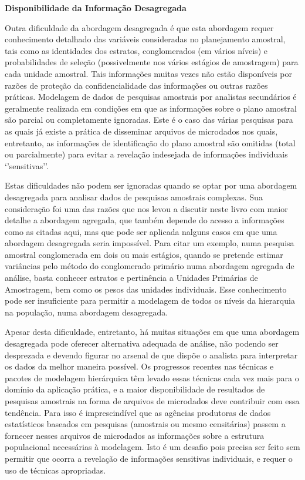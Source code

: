 \documentclass[]{book}
\theoremstyle{definition}
\theoremstyle{definition}
\theoremstyle{definition}
\theoremstyle{remark}
\begin{document}
\textbf{Disponibilidade da Informação Desagregada}

Outra dificuldade da abordagem desagregada é que esta abordagem requer
conhecimento detalhado das variáveis consideradas no planejamento
amostral, tais como as identidades dos estratos, conglomerados (em
vários níveis) e probabilidades de seleção (possivelmente nos vários
estágios de amostragem) para cada unidade amostral. Tais informações
muitas vezes não estão disponíveis por razões de proteção da
confidencialidade das informações ou outras razões práticas. Modelagem
de dados de pesquisas amostrais por analistas secundários é geralmente
realizada em condições em que as informações sobre o plano amostral são
parcial ou completamente ignoradas. Este é o caso das várias pesquisas
para as quais já existe a prática de disseminar arquivos de microdados
nos quais, entretanto, as informações de identificação do plano amostral
são omitidas (total ou parcialmente) para evitar a revelação indesejada
de informações individuais `'sensitivas''.

Estas dificuldades não podem ser ignoradas quando se optar por uma
abordagem desagregada para analisar dados de pesquisas amostrais
complexas. Sua consideração foi uma das razões que nos levou a discutir
neste livro com maior detalhe a abordagem agregada, que também depende
do acesso a informações como as citadas aqui, mas que pode ser aplicada
nalguns casos em que uma abordagem desagregada seria impossível. Para
citar um exemplo, numa pesquisa amostral conglomerada em dois ou mais
estágios, quando se pretende estimar variâncias pelo método do
conglomerado primário numa abordagem agregada de análise, basta conhecer
estratos e pertinência a Unidades Primárias de Amostragem, bem como os
pesos das unidades individuais. Esse conhecimento pode ser insuficiente
para permitir a modelagem de todos os níveis da hierarquia na população,
numa abordagem desagregada.

Apesar desta dificuldade, entretanto, há muitas situações em que uma
abordagem desagregada pode oferecer alternativa adequada de análise, não
podendo ser desprezada e devendo figurar no arsenal de que dispõe o
analista para interpretar os dados da melhor maneira possível. Os
progressos recentes nas técnicas e pacotes de modelagem hierárquica têm
levado essas técnicas cada vez mais para o domínio da aplicação prática,
e a maior disponibilidade de resultados de pesquisas amostrais na forma
de arquivos de microdados deve contribuir com essa tendência. Para isso
é imprescindível que as agências produtoras de dados estatísticos
baseados em pesquisas (amostrais ou mesmo censitárias) passem a fornecer
nesses arquivos de microdados as informações sobre a estrutura
populacional necessárias à modelagem. Isto é um desafio pois precisa ser
feito sem permitir que ocorra a revelação de informações sensitivas
individuais, e requer o uso de técnicas apropriadas.
\end{document}
